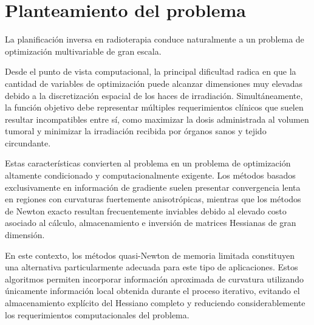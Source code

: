 \section{Planteamiento del problema}

La planificación inversa en radioterapia conduce naturalmente a un problema de optimización multivariable de gran escala.

Desde el punto de vista computacional, la principal dificultad radica en que la cantidad de variables de optimización puede alcanzar dimensiones muy elevadas debido a la discretización espacial de los haces de irradiación. Simultáneamente, la función objetivo debe representar múltiples requerimientos clínicos que suelen resultar incompatibles entre sí, como maximizar la dosis administrada al volumen tumoral y minimizar la irradiación recibida por órganos sanos y tejido circundante.

Estas características convierten al problema en un problema de optimización altamente condicionado y computacionalmente exigente. Los métodos basados exclusivamente en información de gradiente suelen presentar convergencia lenta en regiones con curvaturas fuertemente anisotrópicas, mientras que los métodos de Newton exacto resultan frecuentemente inviables debido al elevado costo asociado al cálculo, almacenamiento e inversión de matrices Hessianas de gran dimensión.

En este contexto, los métodos quasi-Newton de memoria limitada constituyen una alternativa particularmente adecuada para este tipo de aplicaciones. Estos algoritmos permiten incorporar información aproximada de curvatura utilizando únicamente información local obtenida durante el proceso iterativo, evitando el almacenamiento explícito del Hessiano completo y reduciendo considerablemente los requerimientos computacionales del problema.